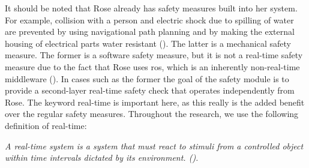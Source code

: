 \documentclass[12pt]{scrreprt}
\begin{document}
 
It should be noted that Rose already has safety measures built into her system. For example, collision with a person and electric shock due to spilling of water are prevented by using navigational path planning and by making the external housing of electrical parts water resistant (\cite{risk_analysis}). The latter is a mechanical safety measure. The former is a software safety measure, but it is not a real-time safety measure due to the fact that Rose uses \acrfull{ros}, which is an inherently non-real-time middleware (\cite{why_is_ros_not_realtime}). In cases such as the former the goal of the safety module is to provide a second-layer real-time safety check that operates independently from Rose. The keyword real-time is important here, as this really is the added benefit over the regular safety measures. Throughout the research, we use the following definition of real-time: 

\begin{flushleft}
\textit{
A real-time system is a system that must react to stimuli from a controlled object within time intervals dictated by its environment. (\cite{realtime_systems}).
}
\end{flushleft}
\end{document}
